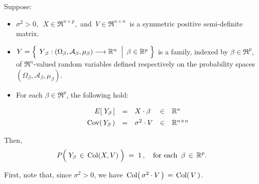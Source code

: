 \vskip 1.0cm
\begin{proposition}\label{PYinColXVEqOne}
\mbox{}
\vskip 0.1cm
\noindent
Suppose:
\begin{itemize}
\item
	$\sigma^{2} > 0$,\,
	\,$X \in \Re^{n \times p}$,\,
	and
	\,$V \in \Re^{n \times n}$\,
	is a symmetric positive semi-definite matrix.
\item
	$Y = \left\{\;
		\left.
		\overset{{\color{white}.}}{Y}_{\beta} : (\Omega_{\beta},\mathcal{A}_{\beta},\mu_{\beta}) \longrightarrow \Re^{n}
		\;\;\right\vert\;
		\beta \in \Re^{p}
		\;\right\}$
	is a family, indexed by $\beta \in \Re^{p}$,
	of $\Re^{n}$-valued random variables defined respectively on the
	probability spaces $(\Omega_{\beta},\mathcal{A}_{\beta},\mu_{\beta})$.
\item
	For each $\beta \in \Re^{p}$, the following hold:
	\begin{equation*}
	\begin{array}{rclcl}
	E\!\left[\;Y_{\beta}\,\right] &  \overset{{\color{white}\vert}}{=} & X \cdot \beta & \in & \Re^{n}
	\\
	\Cov\!\left(\,Y_{\beta}\,\right) & \overset{{\color{white}\vert}}{=} & \sigma^{2} \cdot V & \in & \Re^{n \times n}
	\end{array}
	\end{equation*}
\end{itemize}
Then,
\begin{equation*}
	P\!\left(\;Y_{\beta} \, \overset{{\color{white}.}}{\in} \, \Col(X,V)\;\right) \; = \; 1\,,
	\quad
	\textnormal{for each \,$\beta \,\in\, \Re^{p}$}.
\end{equation*}
\end{proposition}
\proof
First, note that, since $\sigma^{2} > 0$, we have \,$\textnormal{Col}\!\left(\,\sigma^{2} \cdot V\,\right) \,=\, \textnormal{Col}\!\left(\,V\,\right)$.

